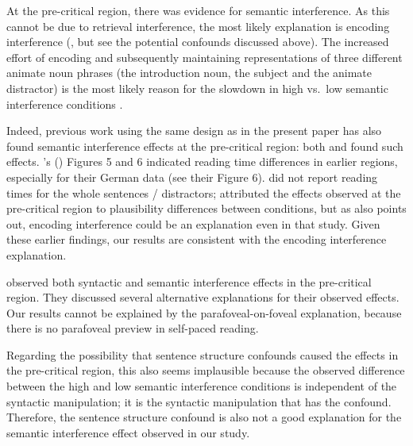\documentclass[review,preprint,12pt,authoryear,floatsintext]{elsarticle}
\begin{document}
At the pre-critical region, there was evidence for semantic interference. As this cannot be due to retrieval interference, the most likely explanation is encoding interference (\cite{Oberauer_Kliegl_2006}, but see the potential confounds discussed above). The increased effort of encoding and subsequently maintaining representations of three different animate noun phrases (the introduction noun, the subject and the animate distractor) is the most likely reason for the slowdown in high vs.\ low semantic interference conditions \citep[for similar findings, see e.g., ][]{lago_etal_2021, ness2019, ness2017, kush_etal_2015, gordon02}. 

Indeed, previous work using the same design as in the present paper has also found semantic interference effects at the pre-critical region: both \cite{vandyke07} and \cite{mertzen} found such effects. \citeauthor{mertzen}'s (\citeyear{mertzen}) Figures 5 and 6 indicated reading time differences in earlier regions, especially for their German data (see their Figure 6). \cite{vandyke07} did not report reading times for the whole sentences / distractors;  \citeauthor{vandyke07} attributed the effects observed at the pre-critical region to plausibility differences between conditions, but as \cite{mertzen} also points out, encoding interference could be an explanation even in that study. Given these earlier findings, our results are consistent with the encoding interference explanation.

\cite{mertzen} observed both syntactic and semantic interference effects in the pre-critical region. They discussed several alternative explanations for their observed effects. {}\label{confound} Our results cannot be explained by the parafoveal-on-foveal explanation, because there is no parafoveal preview in self-paced reading. 

Regarding the possibility that sentence structure confounds caused the effects in the pre-critical region, this also seems implausible because the observed difference between the high and low semantic interference conditions is independent of the syntactic manipulation; it is the syntactic manipulation that has the confound. Therefore, the sentence structure confound is also not a good explanation for the semantic interference effect observed in our study. 
\end{document}
